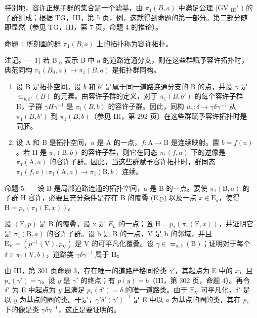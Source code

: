 特别地，容许正规子群的集合是一个滤基，由 \(\pi_1(B,a)\) 中满足公理 (GV \(_{\text{III}}'\) ) 的子群组成；根据 TG，III，第 5 页，例，这就得到命题的第一部分。第二部分随即显然（参见 TG，III，第 7 页，命题 4 的推论）。

命题 4 所刻画的群 \(\pi_{1}(B,a)\) 上的拓扑称为容许拓扑。

注记。--- 1) 若 B \(_{0}\) 表示 B 中 \(a\) 的道路连通分支，则在这些群赋予容许拓扑时，典范同构 \(\pi_{1}(B_{0}, a) \to \pi_{1}(B, a)\) 是拓扑群同构。

\begin{enumerate}
\def\labelenumi{\arabic{enumi})}
\setcounter{enumi}{1}
\item
设 B 是拓扑空间。设 \(b\) 和 \(b'\) 是属于同一道路连通分支的 B 的点，并设 \(\gamma\) 是 \(\varpi_{b,b'}(B)\) 的元素。由容许子群的定义，对于 \(\pi_1(B,b')\) 的每个容许子群 H，子群 \(\gamma H\gamma^{-1}\) 是 \(\pi_1(B,b)\) 的容许子群。因此，同构 \(u_\gamma \colon \delta \mapsto \gamma \delta \gamma^{-1}\) 从 \(\pi_1(B,b')\) 到 \(\pi_1(B,b)\)（参见 III，第 292 页）在这些群赋予容许拓扑时是同胚。
\item
  设 A 和 B 是拓扑空间，\(a\) 是 A 的一点，\(f\colon\mathrm{A}\to\mathrm{B}\) 是连续映射。置 \(b=f(a)\)。若 H 是 \(\pi_{1}(\mathrm{B},b)\) 的容许子群，则它在同态 \(\pi_{1}(f,a)\) 下的逆像是 \(\pi_{1}(\mathrm{A},a)\) 的容许子群。因此，当这些群赋予容许拓扑时，群同态 \(\pi_{1}(f,a)\colon\pi_{1}(\mathrm{A},a)\to\pi_{1}(\mathrm{B},b)\) 连续。
\end{enumerate}

命题 5. --- 设 B 是局部道路连通的拓扑空间，a 是 B 的一点。要使 \(\pi_1(\mathrm{B},a)\) 的子群 H 容许，必要且充分条件是存在 B 的覆叠 (E,p) 以及一点 \(x\in \mathrm{E}_a\)，使得 \(\mathrm{H} = p_{*}(\pi_{1}(\mathrm{E},x))\)。

设 \((\mathrm{E},p)\) 是 B 的覆叠，设 x 是 \(E_{a}\) 的一点；置 \(\mathrm{H}=p_{*}(\pi_{1}(\mathrm{E},x))\)，并证明它是 \(\pi_{1}(\mathrm{B},a)\) 的容许子群。设 b 是 B 的一点，V 是 b 的邻域，并且 \(\mathrm{E}_{\mathrm{V}}=(p^{-1}(\mathrm{V}),p_{\mathrm{V}})\) 是 V 的可平凡化覆叠。设 \(\gamma\in\varpi_{a,b}(\mathrm{B})\)；证明对于每个 \(\delta\in\pi_{1}(\mathrm{V},b)\)，道路类 \(\gamma\delta\gamma^{-1}\) 属于 H。

由 III，第 301 页命题 3，存在唯一的道路严格同伦类 \(\gamma'\)，其起点为 E 中的 \(x\)，且 \(p_*(\gamma') = \gamma\)。设 \(y\) 是 \(\gamma'\) 的终点；有 \(p(y) = b\)（III，第 302 页，命题 4）。再令 \(\delta'\) 为 E 中起点为 \(y\) 且满足 \(p_*(\delta') = \delta\) 的唯一道路类。由于 \(\mathrm{E_V}\) 可平凡化，\(\delta'\) 是以 \(y\) 为基点的圈的类。于是，\(\gamma'\delta'(\gamma')^{-1}\) 是 E 中以 \(a\) 为基点的圈的类，其在 \(p_*\) 下的像是类 \(\gamma\delta\gamma^{-1}\)，这正是要证明的。

